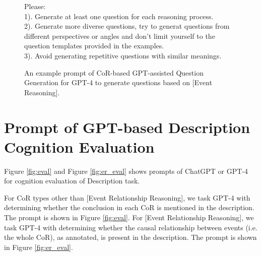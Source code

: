 \begin{figure*}[h]
\begin{tcolorbox}
    Please: \\
    1). Generate at least one question for each reasoning process. \\
    2). Generate more diverse questions, try to generat questions from different perspectives or angles and don't limit yourself to the question templates provided in the examples. \\
    3). Avoid generating repetitive questions with similar meanings. \\
    \end{tcolorbox}
    \caption{An example prompt of CoR-based GPT-assisted Question Generation for GPT-4 to generate questions based on [Event Reasoning].}
    \label{fig:cgqg_prompt}
  \end{figure*}

\section{Prompt of GPT-based Description Cognition Evaluation}
\label{sec:cogid_eval_prompt}

Figure \ref{fig:eval} and Figure \ref{fig:er_eval} shows prompts of ChatGPT or GPT-4 for cognition evaluation of Description task. 

For CoR types other than [Event Relationship Reasoning], we task GPT-4 with determining whether the conclusion in each CoR is mentioned in the description. 
The prompt is shown in Figure \ref{fig:eval}.
For [Event Relationship Reasoning], we task GPT-4 with determining whether the causal relationship between events (i.e. the whole CoR), as annotated, is present in the description.
The prompt is shown in Figure \ref{fig:er_eval}.


